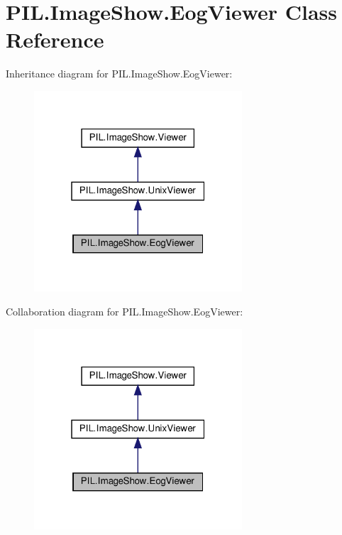 \hypertarget{classPIL_1_1ImageShow_1_1EogViewer}{}\section{P\+I\+L.\+Image\+Show.\+Eog\+Viewer Class Reference}
\label{classPIL_1_1ImageShow_1_1EogViewer}


Inheritance diagram for P\+I\+L.\+Image\+Show.\+Eog\+Viewer\+:
\nopagebreak
\begin{figure}[H]
\begin{center}
\leavevmode
\includegraphics[width=220pt]{classPIL_1_1ImageShow_1_1EogViewer__inherit__graph}
\end{center}
\end{figure}


Collaboration diagram for P\+I\+L.\+Image\+Show.\+Eog\+Viewer\+:
\nopagebreak
\begin{figure}[H]
\begin{center}
\leavevmode
\includegraphics[width=220pt]{classPIL_1_1ImageShow_1_1EogViewer__coll__graph}
\end{center}
\end{figure}
